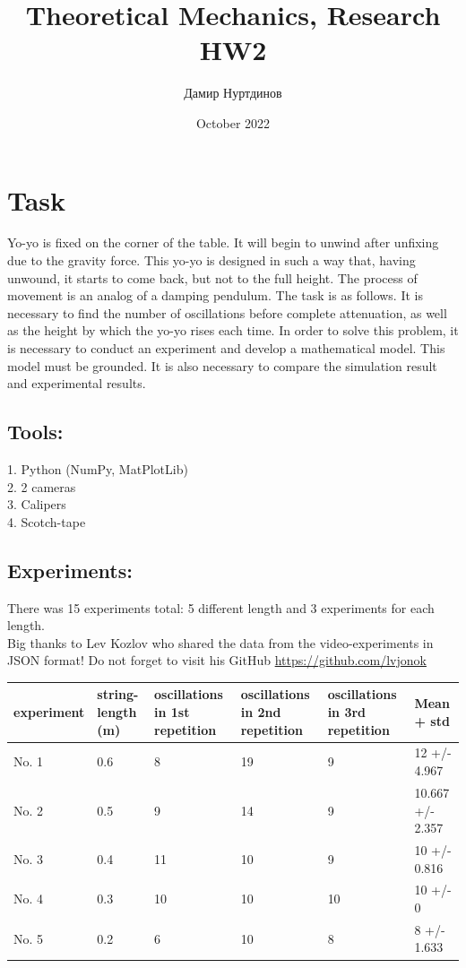 \documentclass[a4paper,11pt,oneside,article]{memoir}
\title{Theoretical Mechanics, Research HW2}
\author{Дамир Нуртдинов}
\date{October 2022}
\begin{document}
\section*{Task}
Yo-yo is fixed on the corner of the table. It will begin to unwind after
unfixing due to the gravity force. This yo-yo is designed in such a way that, having unwound, it starts to come back, but not to the full height. The process
of movement is an analog of a damping pendulum. The task is as follows. It is
necessary to find the number of oscillations before complete attenuation, as
well as the height by which the yo-yo rises each time. In order to solve this
problem, it is necessary to conduct an experiment and develop a mathematical
model. This model must be grounded. It is also necessary to compare the
simulation result and experimental results.

\subsection{Tools:}
1. Python (NumPy, MatPlotLib)\\
2. 2 cameras\\
3. Calipers\\
4. Scotch-tape

\subsection{Experiments:}
There was 15 experiments total: 5 different length and 3 experiments for each length.\\
Big thanks to Lev Kozlov who shared the data from the video-experiments in JSON format! Do not forget to visit his GitHub \url{https://github.com/lvjonok}
\begin{center}
\begin{tabular}{ | m{5em} | m{1cm}| m{2cm} | m{2cm} |m{2cm} |m{2cm} |} 
  \hline
   experiment& string-length (m) & oscillations in 1st repetition& oscillations in 2nd repetition& oscillations in 3rd repetition& Mean + std \\ 
  \hline
   No. 1 & 0.6 & 8 & 19 & 9 & 12 +/- 4.967\\ 
  \hline
  No. 2 & 0.5 & 9 & 14 & 9 & 10.667 +/- 2.357\\ 
  \hline
  No. 3 & 0.4 & 11 & 10 & 9 & 10 +/- 0.816\\ 
  \hline
  No. 4 & 0.3 & 10 & 10 & 10 & 10 +/- 0\\ 
  \hline
  No. 5 & 0.2 & 6 & 10 & 8 & 8 +/- 1.633\\ 
  \hline
\end{tabular}
\end{center}
\end{document}
